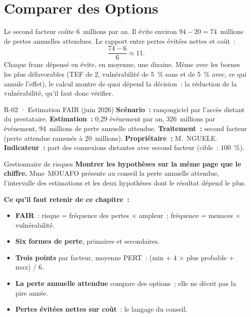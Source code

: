 \section{Comparer des Options}
\label{sec:c09-options}

Le second facteur coûte 6~millions par an. Il évite environ
$94 - 20 = 74$~millions de pertes annuelles attendues. Le rapport entre
pertes évitées nettes et coût~:
\[
\frac{74 - 6}{6} \approx 11.
\]
Chaque franc dépensé en évite, en moyenne, une dizaine. Même avec les
bornes les plus défavorables (TEF de 2, vulnérabilité de 5~\% sans et de
5~\% avec, ce qui annule l'effet), le calcul montre de quoi dépend la
décision~: la réduction de la vulnérabilité, qu'il faut donc vérifier.

\begin{boxobjet}{R-02 · Estimation FAIR (juin 2026)}
\textbf{Scénario~:} rançongiciel par l'accès distant du prestataire.
\textbf{Estimation~:} 0,29 événement par an, 326~millions par événement,
94~millions de perte annuelle attendue. \textbf{Traitement~:} second
facteur (perte attendue ramenée à 20~millions). \textbf{Propriétaire~:}
M.~NGUELE. \textbf{Indicateur~:} part des connexions distantes avec second
facteur (cible~: 100~\%).
\end{boxobjet}

\begin{boxmetier}{Gestionnaire de risques}
\textbf{Montrer les hypothèses sur la même page que le chiffre.} Mme~MOUAFO
présente au conseil la perte annuelle attendue, l'intervalle des
estimations et les deux hypothèses dont le résultat dépend le plus.
\end{boxmetier}

\separateur

\begin{boxresume}
\textbf{Ce qu'il faut retenir de ce chapitre~:}
\begin{itemize}
    \item \textbf{FAIR}~: risque = fréquence des pertes × ampleur~;
          fréquence = menaces × vulnérabilité.
    \item \textbf{Six formes de perte}, primaires et secondaires.
    \item \textbf{Trois points} par facteur, moyenne PERT~: (min + 4 × plus
          probable + max) / 6.
    \item \textbf{La perte annuelle attendue} compare des options~; elle ne
          décrit pas la pire année.
    \item \textbf{Pertes évitées nettes sur coût}~: le langage du conseil.
\end{itemize}
\end{boxresume}

